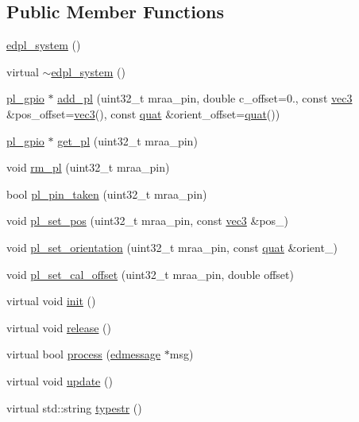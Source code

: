 \subsection*{Public Member Functions}
\begin{DoxyCompactItemize}
\item 
\hyperlink{classedpl__system_a346231e6092910c7dfd6dd962ee25bc5}{edpl\-\_\-system} ()
\item 
virtual \hyperlink{classedpl__system_a94d6ed134e1abd43c4af6ae3d632f462}{$\sim$edpl\-\_\-system} ()
\item 
\hyperlink{structedpl__system_1_1pl__gpio}{pl\-\_\-gpio} $\ast$ \hyperlink{classedpl__system_ae42b9824a6d9626accbd234375f79c09}{add\-\_\-pl} (uint32\-\_\-t mraa\-\_\-pin, double c\-\_\-offset=0., const \hyperlink{nsmath_8h_a14bb8a4a0fefc0be4fae32fc59a07362}{vec3} \&pos\-\_\-offset=\hyperlink{nsmath_8h_a14bb8a4a0fefc0be4fae32fc59a07362}{vec3}(), const \hyperlink{nsmath_8h_aa07476c74d8e3787a771c94c92354496}{quat} \&orient\-\_\-offset=\hyperlink{nsmath_8h_aa07476c74d8e3787a771c94c92354496}{quat}())
\item 
\hyperlink{structedpl__system_1_1pl__gpio}{pl\-\_\-gpio} $\ast$ \hyperlink{classedpl__system_a4a4369822031f0f4523abc12125d92d1}{get\-\_\-pl} (uint32\-\_\-t mraa\-\_\-pin)
\item 
void \hyperlink{classedpl__system_ab1e65466442581ce851bec4d4bd40459}{rm\-\_\-pl} (uint32\-\_\-t mraa\-\_\-pin)
\item 
bool \hyperlink{classedpl__system_a9a32ffdff7b99e9ad1f6562f508cd12f}{pl\-\_\-pin\-\_\-taken} (uint32\-\_\-t mraa\-\_\-pin)
\item 
void \hyperlink{classedpl__system_a792001c061fe40e388d7c5aaf428f389}{pl\-\_\-set\-\_\-pos} (uint32\-\_\-t mraa\-\_\-pin, const \hyperlink{nsmath_8h_a14bb8a4a0fefc0be4fae32fc59a07362}{vec3} \&pos\-\_\-)
\item 
void \hyperlink{classedpl__system_a8e7eef161b591dd20b5e23fd246ac3f4}{pl\-\_\-set\-\_\-orientation} (uint32\-\_\-t mraa\-\_\-pin, const \hyperlink{nsmath_8h_aa07476c74d8e3787a771c94c92354496}{quat} \&orient\-\_\-)
\item 
void \hyperlink{classedpl__system_a54044ef9b7b84731ada0b6ec425225ea}{pl\-\_\-set\-\_\-cal\-\_\-offset} (uint32\-\_\-t mraa\-\_\-pin, double offset)
\item 
virtual void \hyperlink{classedpl__system_a4d9fae9e10da9cae1f1e7a00e751c933}{init} ()
\item 
virtual void \hyperlink{classedpl__system_adb2b906b466251dc513fb9d669a19e99}{release} ()
\item 
virtual bool \hyperlink{classedpl__system_a4aae16b8695eec7c54ccfaecee9c535c}{process} (\hyperlink{structedmessage}{edmessage} $\ast$msg)
\item 
virtual void \hyperlink{classedpl__system_ae84af8dea7c53fe3219e7cde15ddd43a}{update} ()
\item 
virtual std\-::string \hyperlink{classedpl__system_ab758bc4300926af08e47e0c8b655d8fc}{typestr} ()
\end{DoxyCompactItemize}
